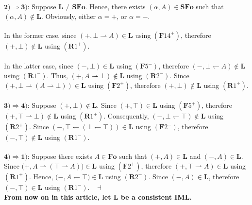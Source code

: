 \documentclass[draft]{article}
\newenvironment{proof}{{\bf Proof:}}{~$\dashv$\\}
\def\Formula{\mathbf{A}}
\def\Formula{\mathbf{F}}
\def\Rule{\mathbf{R}}
\def\Fo{\mathbf{Fo}}
\def\SFo{\mathbf{SFo}}
\def\L{\mathbf{L}}
\begin{document}
\begin{proof}
%
%
$\mathbf{2){\Rightarrow}3)}$:
Suppose $\L{\not=}\SFo$.
Hence, there exists $(\alpha,A){\in}\SFo$ such that $(\alpha,A){\not\in}
%
%
%
%
%
%
%
$\linebreak$
%
%
%
%
%
%
\L$.
Obviously, either $\alpha{=}+$, or $\alpha{=}-$.
%
%
\\
\\
%
%
In the former case, since $(+,{\bot}{\rightharpoonup}A){\in}\L$ using $(\Formula14^{+})$, therefore $(+,{\bot}){\not\in}\L$ using $(\Rule1^{+})$.
%
%
\\
\\
%
%
In the latter case, since $(-,{\bot}){\in}\L$ using $(\Formula5^{-})$, therefore $(-,{\bot}{\leftharpoondown}A){\not\in}\L$ using $(\Rule1^{-})$.
Thus, $(+,A{\rightharpoonup}{\bot}){\not\in}\L$ using $(\Rule2^{-})$.
Since $(+,{\bot}{\rightharpoonup}(A{\rightharpoonup}{\bot})){\in}\L$ using $(\Formula2^{+})$, therefore $(+,{\bot}){\not\in}\L$ using $(\Rule1^{+})$.
%
%
\\
\\
%
%
$\mathbf{3){\Rightarrow}4)}$:
Suppose $(+,{\bot}){\not\in}\L$.
Since $(+,{\top}){\in}\L$ using $(\Formula5^{+})$, therefore $(+,{\top}{\rightharpoonup}{\bot}){\not\in}\L$ using $(\Rule1^{+})$.
Consequently, $(-,{\bot}{\leftharpoondown}{\top}){\not\in}\L$ using $(\Rule2^{+})$.
Since $(-,{\top}{\leftharpoondown}({\bot}{\leftharpoondown}{\top})){\in}\L$ using $(\Formula2^{-})$, therefore $(-,{\top}){\not\in}\L$ using $(\Rule1^{-})$.
%
%
\\
\\
%
%
$\mathbf{4){\Rightarrow}1)}$:
Suppose there exists $A{\in}\Fo$ such that $(+,A){\in}\L$ and $(-,A){\in}\L$.
Since $(+,A
%
%
%
%
%
%
%
$\linebreak$
%
%
%
%
%
%
{\rightharpoonup}({\top}{\rightharpoonup}A)){\in}\L$ using $(\Formula2^{+})$, therefore $(+,{\top}{\rightharpoonup}A){\in}\L$ using $(\Rule1^{+})$.
Hence, $(-,A{\leftharpoondown}
%
%
%
%
%
%
%
$\linebreak$
%
%
%
%
%
%
{\top}){\in}\L$ using $(\Rule2^{-})$.
Since $(-,A){\in}\L$, therefore $(-,{\top}){\in}\L$ using $(\Rule1^{-})$.
%
%
\medskip
%
%
\end{proof}
%
%
{\bf From now on in this article, let $\L$ be a consistent IML.}
%
%
%
%
\end{document}
